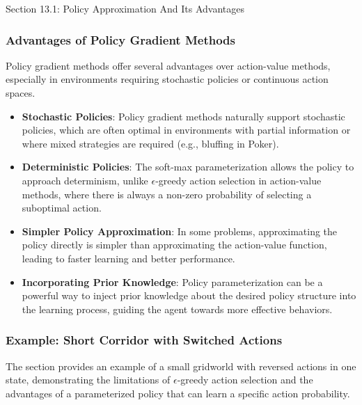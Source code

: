 \begin{notes}{Section 13.1: Policy Approximation And Its Advantages}
\begin{highlight}
    \end{highlight}
    
    \subsubsection*{Advantages of Policy Gradient Methods}
    
    Policy gradient methods offer several advantages over action-value methods, especially in environments requiring stochastic policies or continuous action spaces.
    
    \begin{highlight}
    
        \begin{itemize}
            \item \textbf{Stochastic Policies}: Policy gradient methods naturally support stochastic policies, which are often optimal in environments with partial information or where mixed strategies are 
            required (e.g., bluffing in Poker).
            \item \textbf{Deterministic Policies}: The soft-max parameterization allows the policy to approach determinism, unlike $\epsilon$-greedy action selection in action-value methods, where there 
            is always a non-zero probability of selecting a suboptimal action.
            \item \textbf{Simpler Policy Approximation}: In some problems, approximating the policy directly is simpler than approximating the action-value function, leading to faster learning and better 
            performance.
            \item \textbf{Incorporating Prior Knowledge}: Policy parameterization can be a powerful way to inject prior knowledge about the desired policy structure into the learning process, guiding the 
            agent towards more effective behaviors.
        \end{itemize}
    
    \end{highlight}
    
    \subsubsection*{Example: Short Corridor with Switched Actions}
    
    The section provides an example of a small gridworld with reversed actions in one state, demonstrating the limitations of $\epsilon$-greedy action selection and the advantages of a parameterized policy 
    that can learn a specific action probability.
    

\end{notes}
